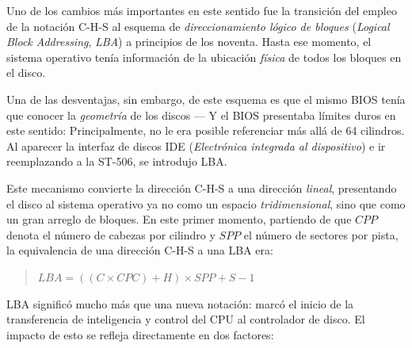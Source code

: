 \documentclass[11pt,fleqn]{book} %
\begin{document}
Uno de los cambios más importantes en este sentido fue la transición
del empleo de la notación C-H-S al esquema de \emph{direccionamiento lógico de bloques} (\emph{Logical Block Addressing}, \emph{LBA}) a principios de los
noventa. Hasta ese momento, el sistema operativo tenía información de
la ubicación \emph{física} de todos los bloques en el disco.

Una de las desventajas, sin embargo, de este esquema es que el mismo
BIOS tenía que conocer la \emph{geometría} de los discos — Y el BIOS
presentaba límites duros en este sentido: Principalmente, no le era
posible referenciar más allá de 64 cilindros. Al aparecer la interfaz
de discos IDE (\emph{Electrónica integrada al dispositivo}) e ir
reemplazando a la ST-506, se introdujo LBA.

Este mecanismo convierte la dirección C-H-S a una dirección \emph{lineal},
presentando el disco al sistema operativo ya no como un espacio
\emph{tridimensional}, sino que como un gran arreglo de bloques. En este
primer momento, partiendo de que $CPP$ denota el número de cabezas por
cilindro y $SPP$ el número de sectores por pista, la equivalencia de
una dirección C-H-S a una LBA era:

\begin{quote}
$LBA = ((C \times CPC) + H) \times SPP + S - 1$
\end{quote}

LBA significó mucho más que una nueva notación: marcó el inicio de
la transferencia de inteligencia y control del CPU al controlador de
disco. El impacto de esto se refleja directamente en dos factores:
\end{document}
